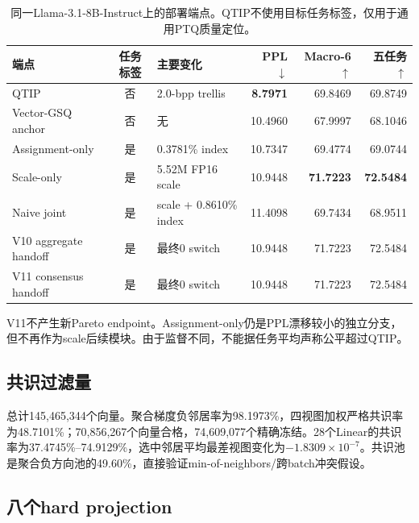 \begin{table}[t]
\centering
\caption{同一Llama-3.1-8B-Instruct上的部署端点。QTIP不使用目标任务标签，仅用于通用PTQ质量定位。}
\begin{tabular}{lclrrr}
\toprule
端点 & 任务标签 & 主要变化 & PPL$\downarrow$ & Macro-6$\uparrow$ & 五任务$\uparrow$\\
\midrule
QTIP & 否 & 2.0-bpp trellis & \textbf{8.7971} & 69.8469 & 69.8749\\
Vector-GSQ anchor & 否 & 无 & 10.4960 & 67.9997 & 68.1046\\
Assignment-only & 是 & 0.3781\% index & 10.7347 & 69.4774 & 69.0744\\
Scale-only & 是 & 5.52M FP16 scale & 10.9448 & \textbf{71.7223} & \textbf{72.5484}\\
Naive joint & 是 & scale + 0.8610\% index & 11.4098 & 69.7434 & 68.9511\\
V10 aggregate handoff & 是 & 最终0 switch & 10.9448 & 71.7223 & 72.5484\\
V11 consensus handoff & 是 & 最终0 switch & 10.9448 & 71.7223 & 72.5484\\
\bottomrule
\end{tabular}
\label{tab:endpoints}
\end{table}

V11不产生新Pareto endpoint。Assignment-only仍是PPL漂移较小的独立分支，但不再作为scale后续模块。由于监督不同，不能据任务平均声称公平超过QTIP。

\subsection{共识过滤量}

总计145,465,344个向量。聚合梯度负邻居率为98.1973\%，四视图加权严格共识率为48.7101\%；70,856,267个向量合格，74,609,077个精确冻结。28个Linear的共识率为37.4745\%--74.9129\%，选中邻居平均最差视图变化为$-1.8309\times10^{-7}$。共识池是聚合负方向池的49.60\%，直接验证min-of-neighbors/跨batch冲突假设。

\subsection{八个hard projection}

